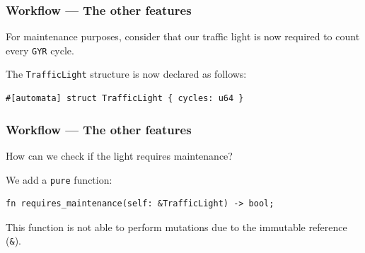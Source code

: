 \documentclass[bigger,notes,aspectratio=169]{beamer}
\begin{document}
\begin{frame}[fragile]
    \frametitle{Workflow --- The other features}
    For maintenance purposes, consider that our traffic light is now required to count every \texttt{GYR} cycle. %

    The \texttt{TrafficLight} structure is now declared as follows:
    \begin{listing}
        \centering
        \begin{verbatim}
#[automata] struct TrafficLight { cycles: u64 }
        \end{verbatim}
    \end{listing}

\end{frame}

\begin{frame}[fragile]
    \frametitle{Workflow --- The other features}
    How can we check if the light requires maintenance?

    We add a \texttt{pure} function:
    \begin{listing}
        \centering
        \begin{verbatim}
fn requires_maintenance(self: &TrafficLight) -> bool;
        \end{verbatim}
    \end{listing}
    This function is not able to perform mutations due to the immutable reference (\texttt{\&}).

\end{frame}
\end{document}
